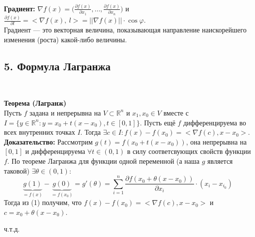\documentclass[book, 11pt]{report}
\begin{document}
        \par
        \noindent\hrulefill\noindent
        \par{\ }
        \par{\textbf{Градиент: } $\displaystyle\nabla f(x)=\bigg(\frac{\partial f(x)}{\partial x_1},\ldots,\frac{\partial f(x)}{\partial x_n}\bigg)$ и $\displaystyle\frac{\partial f(x)}{\partial l}=<\nabla f(x), \ l>=||\nabla f(x)||\cdot\cos{\varphi}$.\\
        Градиент — это векторная величина, показывающая направление наискорейшего изменения (роста) какой-либо величины.}
        \newpage
        \subsection*{5. Формула Лагранжа}
        \par{\ }
        \par{\textbf{Теорема (Лагранж)}\\
        Пусть $f$ задана и непрерывна на $V\subset\mathbb{R}^n$ и $x_1,x_0\in V$ вместе с $I=\{y\in\mathbb{R}^n:y=x_0+t(x-x_0), t\in[0,1]\}$. Пусть ещё $f$ дифференцируема во всех внутренних точках $I$. Тогда $\exists c\in I:f(x)-f(x_0)=<\nabla f(c),x-x_0>$.\\
        \textbf{Доказательство: }Рассмотрим $g(t)=f(x_0+t(x-x_0))$, она непрерывна на $[0,1]$ и дифференцируема $\forall t\in(0,1)$ в силу соответсвующих свойств функции $f$. По теореме Лагранжа для функции одной переменной (а наша $g$ является таковой) $\exists\theta\in(0,1):$
        \begin{equation}
            \underbrace{g(1)}_{=f(x)}-\underbrace{g(0)}_{=f(x_0)}=g'(\theta)=\sum_{i=1}^n\frac{\partial f(x_0+\theta(x-x_0))}{\partial x_i}\cdot(x_i-x_{i_0})
        \end{equation}
        Тогда из (1) получим, что $f(x)-f(x_0)=<\nabla f(c),x-x_0>$ и $c=x_0+\theta(x-x_0)$.
        }
        \par{{\raggedleft ч.т.д.\par}}
\end{document}
